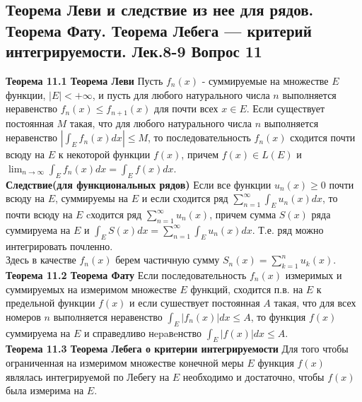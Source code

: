 \documentclass{article}
\begin{document}
\subsection{Теорема Леви и следствие из нее для рядов. Теорема Фату. Теорема Лебега — критерий интегрируемости. Лек.8-9 \textbf{Вопрос 11}}
	\textbf{Теорема 11.1 Теорема Леви} Пусть $f_{n}(x)$ - суммируемые на множестве $E$ функции, $|E|<+\infty$, и пусть для любого натурального числа $n$ выполняется неравенство ${f}_{n}(x)\le {f}_{n+1}(x)$ для почти всех $x\in E$. Если существует постоянная $M$ такая, что для
	любого натурального числа $n$ выполняется неравенство $|\int_{E} {f}_{n}(x)dx|\le M$, то последовательность ${f_{n}(x)}$ сходится почти всюду на $E$ к некоторой функции $f(x)$, причем $f(x)\in L(E)$ и $\lim _{n \rightarrow \infty}\int_{E}f_{n}(x)dx=\int_{E}f(x)dx$.\\
	\textbf{Следствие(для функциональных рядов)} Если все функции $u_{n}(x)\geq 0$ почти всюду на $E$, суммируемы на $E$ и если сходится ряд $\sum_{n=1}^{\infty} \int_{E} u_{n}(x)dx$, то почти всюду на $E$ cходится ряд $\sum_{n=1}^{\infty} u_{n}(x)$, причем сумма $S(x)$ ряда суммируема на $E$ и $\int_{E} S(x)dx=\sum_{n=1}^{\infty} \int_{E} u_{n}(x)dx$. Т.е. ряд можно интегрировать почленно. \\
	Здесь в качестве $f_{n}(x)$ берем частичную сумму $S_{n}(x)=\sum_{k=1}^{n} u_{k}(x)$.\\ 
	
	\textbf{Теорема 11.2 Теорема Фату} Если последовательность ${f_{n}(x)}$ измеримых и суммируемых на измеримом множестве $E$ функций, сходится п.в. на $E$ к предельной функции $f(x)$ и если сушествует постоянная $A$ такая, что для всех номеров $n$ выполняется неравенство $\int_{E}\left|f_{n}(x)\right| d x \leqslant A$, то функция $f(x)$ суммируема на $E$ и справедливо нepaвeнство $\int_{E}|f(x)|dx\leqslant A$.\\ 
	
	\textbf{Теорема 11.3 Теорема Лебега о критерии интегрируемости} Для того чтобы ограниченная на измеримом множестве конечной меры $E$ функция $f(x)$ являлась интегрируемой по Лебегу на $E$ необходимо и достаточно, чтобы $f(x)$ была измерима на $E$.\\
\end{document}
